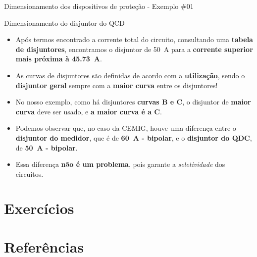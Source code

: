 \begin{frame}{Dimensionamento dos dispositivos de proteção - Exemplo \#01}
	\begin{block}{Dimensionamento do disjuntor do QCD}
		\begin{itemize}
			\item Após termos encontrado a corrente total do circuito, consultando uma \textbf{tabela de disjuntores}, encontramos o disjuntor de \SI{50}{\ampere} para a \textbf{corrente superior mais próxima à \SI{45,73}{\ampere}}.
			\item As curvas de disjuntores são definidas de acordo com a \textbf{utilização}, sendo o \textbf{disjuntor geral} sempre com a \textbf{maior curva} entre os disjuntores!
			\item No nosso exemplo, como há disjuntores \textbf{curvas B e C}, o disjuntor de \textbf{maior curva} deve ser usado, e \textbf{a maior curva é a C}.
			\item Podemos observar que, no caso da CEMIG, houve uma diferença entre o \textbf{disjuntor do medidor}, que é de \textbf{\SI{60}{\ampere} - bipolar}, e o \textbf{disjuntor do QDC}, de \textbf{\SI{50}{\ampere} - bipolar}.
			\item Essa diferença \textbf{não é um problema}, pois garante a \textit{seletividade} dos circuitos.
		\end{itemize}
	\end{block}
\end{frame}


\section*{Exercícios}

\section*{Referências}

